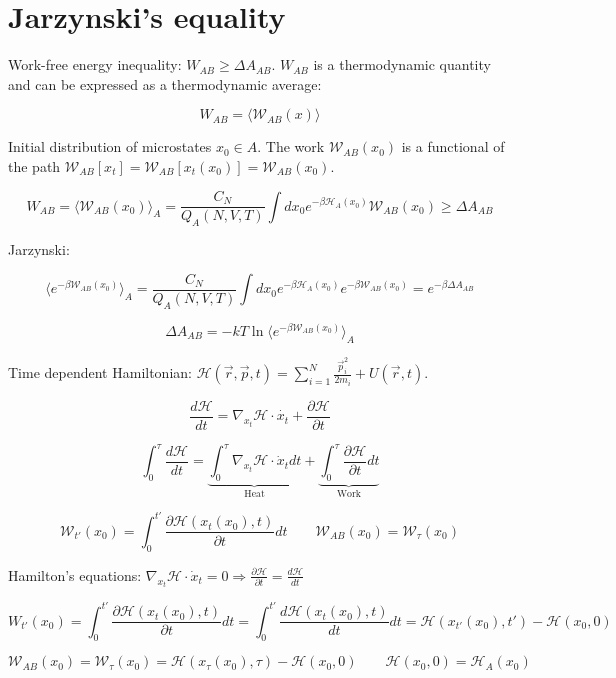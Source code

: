 \section{Jarzynski's equality}
Work-free energy inequality: $W_{AB}\ge \Delta A_{AB}$.
$W_{AB}$ is a thermodynamic quantity and can be expressed as a thermodynamic average:

$$W_{AB} = \langle\mathcal{W}_{AB}(x)\rangle$$

Initial distribution of microstates $x_0\in A$.
The work $\mathcal{W}_{AB}(x_0)$ is a functional of the path $\mathcal{W}_{AB}[x_t] = \mathcal{W}_{AB}[x_t(x_0)] = \mathcal{W}_{AB}(x_0)$.

$$W_{AB} = \langle\mathcal{W}_{AB}(x_0)\rangle_A=\frac{C_N}{Q_A(N, V, T)}\int dx_0e^{-\beta\mathcal{H}_A(x_0)}\mathcal{W}_{AB}(x_0)\ge \Delta A_{AB}$$

Jarzynski:

$$\langle e^{-\beta\mathcal{W}_{AB}(x_0)}\rangle_A = \frac{C_N}{Q_A(N, V, T)}\int dx_0e^{-\beta\mathcal{H}_A(x_0)}e^{-\beta\mathcal{W}_{AB}(x_0)} = e^{-\beta\Delta A_{AB}}$$

$$\Delta A_{AB} = -kT\ln\langle e^{-\beta\mathcal{W}_{AB}(x_0)}\rangle_A$$

Time dependent Hamiltonian: $\mathcal{H}(\vec{r}, \vec{p}, t) = \sum\limits_{i=1}^N\frac{\vec{p}_i^2}{2m_i} + U(\vec{r}, t)$.

$$\frac{d\mathcal{H}}{dt} = \nabla_{x_t}\mathcal{H}\cdot\dot{x_t}+\frac{\partial\mathcal{H}}{\partial t}$$

$$\int_0^\tau\frac{d\mathcal{H}}{dt} = \underbrace{\int_0^\tau\nabla_{x_t}\mathcal{H}\cdot\dot{x}_tdt}_{\text{Heat}}+\underbrace{\int_0^\tau\frac{\partial\mathcal{H}}{\partial t}dt}_{\text{Work}}$$

$$\mathcal{W}_{t'}(x_0) = \int_0^{t'}\frac{\partial\mathcal{H}(x_t(x_0), t)}{\partial t}dt\qquad \mathcal{W}_{AB}(x_0) = \mathcal{W}_\tau(x_0)$$

Hamilton's equations: $\nabla_{x_t}\mathcal{H}\cdot\dot{x}_t = 0\Rightarrow\frac{\partial\mathcal{H}}{\partial t} = \frac{d\mathcal{H}}{dt}$

$$W_{t'}(x_0) = \int_0^{t'}\frac{\partial\mathcal{H}(x_t(x_0),t)}{\partial t}dt = \int_0^{t'}\frac{d\mathcal{H}(x_t(x_0), t)}{dt}dt = \mathcal{H}(x_{t'}(x_0), t') - \mathcal{H}(x_0, 0)$$

$$\mathcal{W}_{AB}(x_0) = \mathcal{W}_\tau(x_0) = \mathcal{H}(x_\tau(x_0), \tau)-\mathcal{H}(x_0,0)\qquad \mathcal{H}(x_0, 0) = \mathcal{H}_A(x_0)$$

